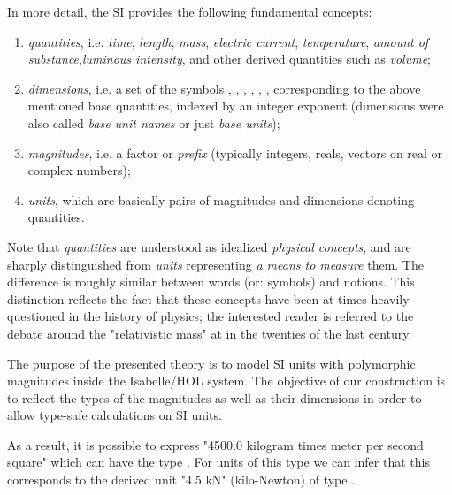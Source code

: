 \documentclass[11pt,a4paper]{book}
\begin{document}
In more detail, the SI provides the following fundamental concepts:

%
\begin{enumerate}%
\item \emph{quantities}, i.e. \emph{time}, \emph{length}, \emph{mass}, \emph{electric current},
\emph{temperature}, \emph{amount of substance},\emph{luminous intensity},
and other derived quantities such as \emph{volume};

\item \emph{dimensions}, i.e. a set of the symbols  , , , ,  \isa{{\isasymTheta}}, ,   corresponding
to the above mentioned base quantities,  indexed by an integer exponent
(dimensions were also called \emph{base unit names} or just \emph{base units});

\item \emph{magnitudes}, i.e. a factor or \emph{prefix}
(typically integers, reals, vectors on real or complex numbers);

\item \emph{units}, which are basically pairs of magnitudes and dimensions denoting quantities.
\end{enumerate}

Note that \emph{quantities} are understood as idealized  \emph{physical concepts}, and are sharply 
distinguished from  \emph{units} representing \emph{a means to measure} them. The difference is 
roughly similar between words (or: symbols) and notions. This distinction reflects the fact that
these concepts have been at times heavily questioned in the history of physics; the interested
reader is referred to the debate around the "relativistic mass" at in the twenties of the last century.

The purpose of the presented theory is to model SI units with polymorphic magnitudes inside the
Isabelle/HOL\cite{nipkow.ea:isabelle:2002} system. The objective of our construction is to
reflect the types of the magnitudes as well as their dimensions in order to allow type-safe 
calculations on SI units.

As a result, it is possible to express "4500.0 kilogram times meter per second square" which can
have the type 
. 
For units of this type we can infer that this corresponds to the derived unit "4.5 kN" (kilo-Newton) 
 of type .  
\end{document}
